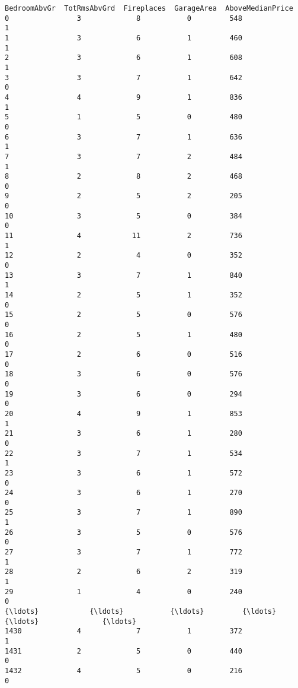 \documentclass[11pt]{article}
\begin{document}
\begin{tcolorbox}[breakable, boxrule=.5pt, size=fbox, pad at break*=1mm, opacityfill=0]
\begin{Verbatim}[commandchars=\\\{\}]
      BedroomAbvGr  TotRmsAbvGrd  Fireplaces  GarageArea  AboveMedianPrice
0                3             8           0         548                 1
1                3             6           1         460                 1
2                3             6           1         608                 1
3                3             7           1         642                 0
4                4             9           1         836                 1
5                1             5           0         480                 0
6                3             7           1         636                 1
7                3             7           2         484                 1
8                2             8           2         468                 0
9                2             5           2         205                 0
10               3             5           0         384                 0
11               4            11           2         736                 1
12               2             4           0         352                 0
13               3             7           1         840                 1
14               2             5           1         352                 0
15               2             5           0         576                 0
16               2             5           1         480                 0
17               2             6           0         516                 0
18               3             6           0         576                 0
19               3             6           0         294                 0
20               4             9           1         853                 1
21               3             6           1         280                 0
22               3             7           1         534                 1
23               3             6           1         572                 0
24               3             6           1         270                 0
25               3             7           1         890                 1
26               3             5           0         576                 0
27               3             7           1         772                 1
28               2             6           2         319                 1
29               1             4           0         240                 0
{\ldots}            {\ldots}           {\ldots}         {\ldots}         {\ldots}               {\ldots}
1430             4             7           1         372                 1
1431             2             5           0         440                 0
1432             4             5           0         216                 0

\end{Verbatim}
\end{tcolorbox}
\end{document}
